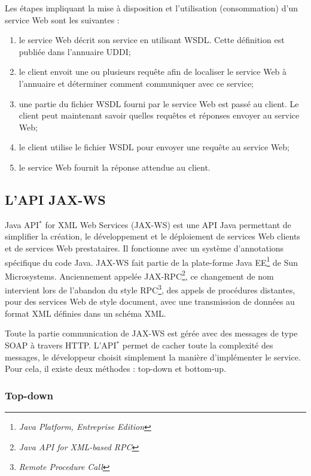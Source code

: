 Les \'etapes impliquant la mise \`a disposition et l'utilisation (consommation) d'un service Web sont les suivantes :

\begin{enumerate}
	\item le service Web d\'ecrit son service en utilisant WSDL. 
	Cette d\'efinition est publi\'ee dans l'annuaire UDDI;
	\item le client envoit une ou plusieurs requ\^ete afin de localiser le service Web \`a l'annuaire et d\'eterminer comment communiquer avec ce service;
	\item une partie du fichier WSDL fourni par le service Web est pass\'e au client. 
	Le client peut maintenant savoir quelles requ\^etes et r\'eponses envoyer au service Web;
	\item le client utilise le fichier WSDL pour envoyer une requ\^ete au service Web;
	\item le service Web fournit la r\'eponse attendue au client.

\end{enumerate}

\subsection{L'API JAX-WS}

Java API$^*$ for XML Web Services (JAX-WS) est une API Java permettant de simplifier la cr\'eation, le d\'eveloppement et le d\'eploiement de services Web clients et de services Web prestataires.
Il fonctionne avec un syst\`eme d'annotations sp\'ecifique du code Java.
JAX-WS fait partie de la plate-forme Java EE\protect\footnote{\textit{Java Platform, Entreprise Edition}} de Sun Microsystems.
Anciennement appel\'ee JAX-RPC\protect\footnote{\textit{Java API for XML-based RPC}}, ce changement de nom intervient lors de l'abandon du style RPC\protect\footnote{\textit{Remote Procedure Call}}, des appels de proc\'edures distantes, pour des services Web de style document, avec une transmission de donn\'ees au format XML d\'efinies dans un sch\'ema XML.

Toute la partie communication de JAX-WS est g\'er\'ee avec des messages de type SOAP \`a travers HTTP.
L'API$^*$ permet de cacher toute la complexit\'e des messages, le d\'eveloppeur choisit simplement la mani\`ere d'impl\'ementer le service. 
Pour cela, il existe deux m\'ethodes : top-down et bottom-up.

\subsubsection{Top-down}

